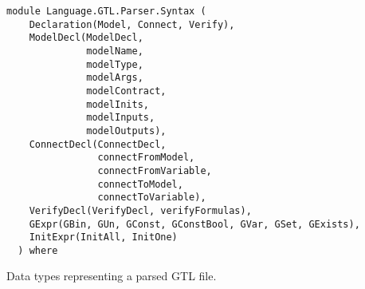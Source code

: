\label{module:Language.GTL.Parser.Syntax}
\haddockbeginheader
{\haddockverb\begin{verbatim}
module Language.GTL.Parser.Syntax (
    Declaration(Model, Connect, Verify), 
    ModelDecl(ModelDecl,
              modelName,
              modelType,
              modelArgs,
              modelContract,
              modelInits,
              modelInputs,
              modelOutputs), 
    ConnectDecl(ConnectDecl,
                connectFromModel,
                connectFromVariable,
                connectToModel,
                connectToVariable), 
    VerifyDecl(VerifyDecl, verifyFormulas), 
    GExpr(GBin, GUn, GConst, GConstBool, GVar, GSet, GExists), 
    InitExpr(InitAll, InitOne)
  ) where\end{verbatim}}
\haddockendheader

Data types representing a parsed GTL file.
\par

